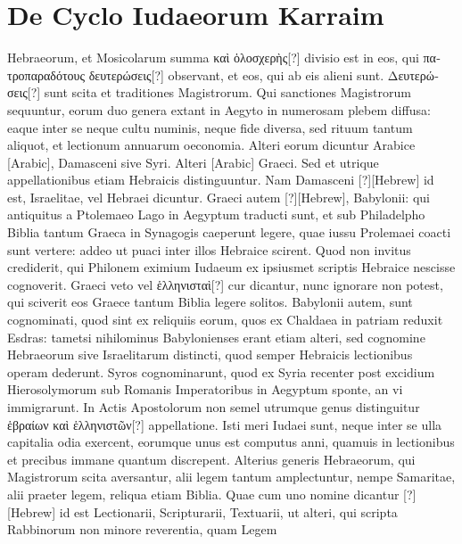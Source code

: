 \section{De Cyclo Iudaeorum Karraim}
%
Hebraeorum, et Mosicolarum summa \textgreek{καὶ ὁλοσχερὴς[?]}
 divisio est
in eos, qui \textgreek{πατροπαραδότους δευτερώσεις[?]} observant, et eos, qui
ab eis alieni sunt.
\textgreek{Δευτερώσεις[?]} sunt scita et traditiones Magistrorum.
Qui sanctiones Magistrorum sequuntur, eorum duo genera
extant in Aegyto in numerosam plebem diffusa: eaque inter se
neque cultu numinis, neque fide diversa, sed rituum tantum aliquot,
et lectionum annuarum oeconomia.
Alteri eorum dicuntur
Arabice \textarabic{[Arabic]}, Damasceni sive Syri.
Alteri \textarabic{[Arabic]}
Graeci.
Sed et utrique appellationibus etiam Hebraicis distinguuntur.
Nam Damasceni \texthebrew{[?]}[Hebrew] id est, Israelitae,
 vel Hebraei dicuntur.
Graeci autem \texthebrew{[?]}[Hebrew], Babylonii:
 qui antiquitus a Ptolemaeo Lago
in Aegyptum traducti sunt, et sub Philadelpho Biblia tantum
Graeca in Synagogis caeperunt legere, quae iussu Prolemaei coacti sunt
vertere: addeo ut puaci inter illos Hebraice scirent.
Quod non invitus
crediderit, qui Philonem eximium Iudaeum ex ipsiusmet scriptis
Hebraice nescisse cognoverit.
Graeci veto vel \textgreek{ἑλληνισταὶ[?]} cur dicantur,
nunc ignorare non potest, qui sciverit eos Graece tantum Biblia
legere solitos.
Babylonii autem, sunt cognominati, quod sint ex reliquiis
eorum, quos ex Chaldaea in patriam reduxit Esdras: tametsi nihilominus
Babylonienses erant etiam alteri, sed cognomine Hebraeorum
sive Israelitarum distincti, quod semper Hebraicis lectionibus
operam dederunt.
Syros cognominarunt, quod ex Syria recenter
post excidium Hierosolymorum sub Romanis Imperatoribus in Aegyptum
sponte, an vi immigrarunt.
In Actis Apostolorum non semel
utrumque genus distinguitur \textgreek{ἑβραίων καὶ ἑλληνιστῶν[?]} appellatione.
Isti
meri Iudaei sunt, neque inter se ulla capitalia odia exercent, eorumque
unus est computus anni, quamuis in lectionibus et precibus
immane quantum discrepent.
Alterius generis Hebraeorum, qui
Magistrorum scita aversantur, alii legem tantum amplectuntur,
nempe Samaritae, alii praeter legem, reliqua etiam Biblia.
Quae cum
uno nomine dicantur \texthebrew{[?]}[Hebrew] id est Lectionarii,
 Scripturarii, Textuarii, ut
alteri, qui scripta Rabbinorum non minore reverentia, quam Legem

